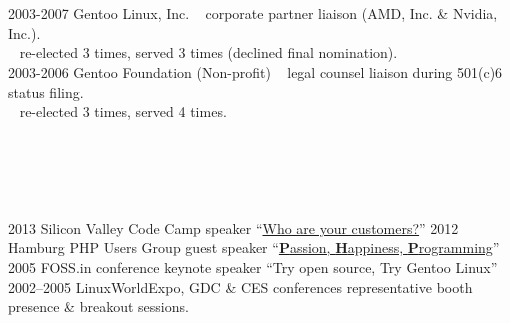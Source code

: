 \documentclass[]{friggeri-cv} %
\begin{document}
\section{{} {} {\normalsize {}~~}}
\begin{entrylist}
\entry
{2003-2007}
{Gentoo Linux, Inc.}
{}
{{\tiny {}} ~ corporate partner liaison (AMD, Inc. \& Nvidia, Inc.).\\
{\tiny {}} ~ re-elected 3 times, served 3 times (declined final nomination).\\}
\entry
{2003-2006}
{Gentoo Foundation (Non-profit)}
{}
{{\tiny {}} ~ legal counsel liaison during 501(c)6 status filing.\\
{\tiny {}} ~ re-elected 3 times, served 4 times.}
\end{entrylist}
\section{{} {} {\normalsize {}~~}}

\begin{entrylist}
\entry
{2013}
{Silicon Valley Code Camp}
{speaker}
{``\href{http://www.siliconvalley-codecamp.com/Session/2013/who-are-your-customers}{Who are your customers?}''}
\entry
{2012}
{Hamburg PHP Users Group}
{guest speaker}
{``\href{https://speakerdeck.com/seemantk/developing-with-passion}{\textbf{P}assion, \textbf{H}appiness, \textbf{P}rogramming}''}
\entry
{2005}
{FOSS.in conference}
{keynote speaker}
{``Try open source, Try Gentoo Linux''}
\entry
{2002--2005}
{LinuxWorldExpo, GDC \& CES conferences}
{representative}
{booth presence \& breakout sessions.}
\end{entrylist}
\end{document}
